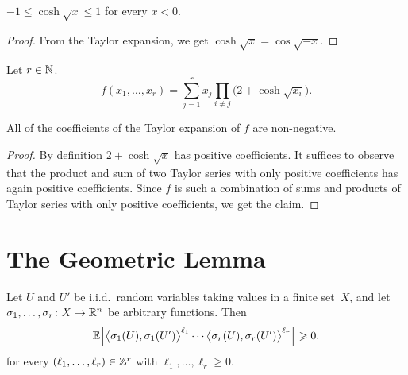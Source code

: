 \begin{lemma}
  \label{lem:coshsqrt-bd-neg}
  $-1 \le \cosh \sqrt{x} \le 1$ for every $x < 0$.
\end{lemma}
\begin{proof}
  From the Taylor expansion, we get $\cosh \sqrt{x} = \cos \sqrt{-x}$.
\end{proof}

\begin{definition}
  \label{def:f}
  Let $r \in \mathbb{N}$.
  \begin{equation}\label{eq:f}
    f(x_1,\dots,x_r) = \sum_{j = 1}^r x_j \prod_{i \ne j} \big( 2 + \cosh\sqrt{x_i} \big).
  \end{equation}
\end{definition}

\begin{lemma}
  \label{lem:taylor-nonneg}
  All of the coefficients of the Taylor expansion of $f$ are non-negative.
\end{lemma}
\begin{proof}
  By definition $2+\cosh\sqrt{x}$ has positive coefficients. It suffices to observe that the product and sum of two Taylor series with only positive coefficients has again positive coefficients. Since $f$ is such a combination of sums and products of Taylor series with only positive coefficients, we get the claim.
\end{proof}


\section{The Geometric Lemma}

\begin{lemma}
  \label{lem:moments}
  Let $U$ and\/ $U'$ be i.i.d.~random variables taking values in a finite set~$X$, and let\/ $\sigma_1,\ldots,\sigma_r \colon X \rightarrow \mathbb{R}^n$ be arbitrary functions. Then
  $$\mathbb{E}\Big[ \big\langle \sigma_1(U),\sigma_1(U') \big\rangle^{\ell_1} \cdots \big\langle \sigma_r(U),\sigma_r(U') \big\rangle^{\ell_r} \Big] \geqslant 0.$$
  for every $(\ell_1,\dots,\ell_r) \in \mathbb{Z}^r$ with $\ell_1,\dots,\ell_r \ge 0$.
\end{lemma}

